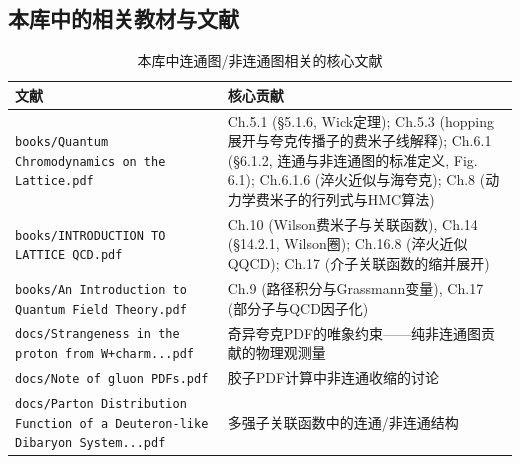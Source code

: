 \documentclass[12pt,a4paper]{ctexart}
\theoremstyle{definition}
\begin{document}
\begin{center}
\end{center}

\subsection{本库中的相关教材与文献}

\begin{table}[H]
\centering
\caption{本库中连通图/非连通图相关的核心文献}
\label{tab:cd_papers}
\small
\begin{tabular}{lp{9cm}}
\toprule
文献 & 核心贡献 \\
\midrule
\texttt{books/Quantum Chromodynamics on the Lattice.pdf} &
Ch.5.1 (\S 5.1.6, Wick定理); Ch.5.3 (hopping展开与夸克传播子的费米子线解释); Ch.6.1 (\S 6.1.2, 连通与非连通图的标准定义, Fig.\,6.1); Ch.6.1.6 (淬火近似与海夸克); Ch.8 (动力学费米子的行列式与HMC算法) \\
\texttt{books/INTRODUCTION TO LATTICE QCD.pdf} &
Ch.10 (Wilson费米子与关联函数), Ch.14 (\S 14.2.1, Wilson圈); Ch.16.8 (淬火近似QQCD); Ch.17 (介子关联函数的缩并展开) \\
\texttt{books/An Introduction to Quantum Field Theory.pdf} &
Ch.9 (路径积分与Grassmann变量), Ch.17 (部分子与QCD因子化) \\
\texttt{docs/Strangeness in the proton from W+charm...pdf} &
奇异夸克PDF的唯象约束——纯非连通图贡献的物理观测量 \\
\texttt{docs/Note of gluon PDFs.pdf} &
胶子PDF计算中非连通收缩的讨论 \\
\texttt{docs/Parton Distribution Function of a Deuteron-like Dibaryon System...pdf} &
多强子关联函数中的连通/非连通结构 \\
\bottomrule
\end{tabular}
\end{table}
\end{document}

